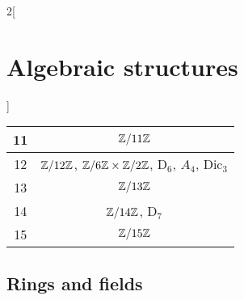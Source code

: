 \documentclass[../../../main.tex]{subfiles}
\begin{document}
\begin{multicols}{2}[\section{Algebraic structures}]
\begin{center}
\begin{tabular}{|c|c|}
            \hline
            11    & $\quot{\ZZ}{11\ZZ}$                                                                                                         \\
            \hline
            12    & $\quot{\ZZ}{12\ZZ}$, $\quot{\ZZ}{6\ZZ}\times\quot{\ZZ}{2\ZZ}$, $\text{D}_6$, $A_4$, $\text{Dic}_3$                          \\
            \hline
            13    & $\quot{\ZZ}{13\ZZ}$                                                                                                         \\
            \hline
            14    & $\quot{\ZZ}{14\ZZ}$, $\text{D}_7$                                                                                           \\
            \hline
            15    & $\quot{\ZZ}{15\ZZ}$                                                                                                         \\
            \hline
        \end{tabular}
    \end{center}
    \subsection{Rings and fields}\label{AS_R}

\end{multicols}
\end{document}
